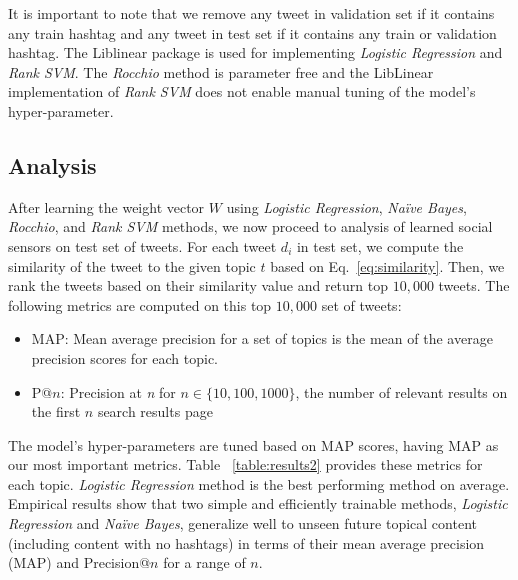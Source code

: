 It is important to note that we remove any tweet in validation set if it contains any train hashtag and any tweet in test set if it contains any train or validation hashtag.
The Liblinear \cite{liblinear} package is used for implementing \textit{Logistic Regression} and \textit{Rank SVM}. 
The \textit{Rocchio} method is parameter free and the LibLinear \cite{liblinear} implementation of \textit{Rank SVM} does not enable manual tuning of the model's hyper-parameter.

\subsection{Analysis}
After learning the weight vector $W$ using \textit{Logistic Regression}, \textit{Na\"{i}ve Bayes}, \textit{Rocchio}, and \textit{Rank SVM} methods, we now proceed to analysis of learned social sensors on test set of tweets.
For each tweet $d_{i}$ in test set, we compute the similarity of the tweet to the given topic $t$ based on Eq.~\ref{eq:similarity}. Then, we rank the tweets based on their similarity value and return top $10,000$ tweets. The following metrics are computed on this top $10,000$ set of tweets:

\begin{itemize}
\item MAP: Mean average precision for a set of topics is the mean of the average precision scores for each topic.
\item P@$n$: Precision at \textit{n} for $n \in \{ 10, 100, 1000 \}$, the number of relevant results on the first $n$ search results page
\end{itemize}

The model's hyper-parameters are tuned based on MAP scores, having MAP as our most important metrics. Table ~\ref{table:results2} provides these metrics for each topic. \textit{Logistic Regression} method is the best performing method on average. Empirical results show that two simple and efficiently trainable methods, \textit{Logistic Regression} and \textit{Na\"{i}ve Bayes}, generalize well to unseen future topical content (including content with no hashtags) in terms of their mean average precision (MAP) and Precision@$n$ for a range of $n$.

